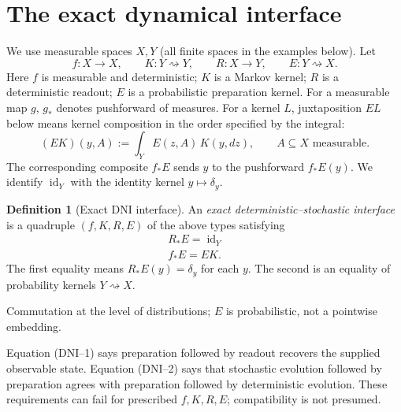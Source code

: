 \documentclass[11pt,letterpaper]{article}
\theoremstyle{definition}
\newtheorem{definition}[theorem]{Definition}
\theoremstyle{remark}
\newcommand{\D}{\mathcal D}
\newcommand{\id}{\operatorname{id}}
\begin{document}
\section{The exact dynamical interface}
We use measurable spaces $X,Y$ (all finite spaces in the examples below). Let
\[
f:X\to X,\qquad K:Y\rightsquigarrow Y,\qquad R:X\to Y,\qquad E:Y\rightsquigarrow X.
\]
Here $f$ is measurable and deterministic; $K$ is a Markov kernel; $R$ is a deterministic readout; $E$ is a probabilistic preparation kernel. For a measurable map $g$, $g_*$ denotes pushforward of measures. For a kernel $L$, juxtaposition $EL$ below means kernel composition in the order specified by the integral:
\[
(EK)(y,A):=\int_Y E(z,A)\,K(y,dz), \qquad A\subseteq X\text{ measurable}.
\]
The corresponding composite $f_*E$ sends $y$ to the pushforward $f_*E(y)$. We identify $\id_Y$ with the identity kernel $y\mapsto\delta_y$.

\begin{definition}[Exact DNI interface]\label{def:dni}
An \emph{exact deterministic--stochastic interface} is a quadruple $(f,K,R,E)$ of the above types satisfying
\begin{align}
\boxed{R_*E=\id_Y} && \tag{DNI--1}\label{eq:read}\\[3pt]
\boxed{f_*E=EK}. && \tag{DNI--2}\label{eq:intertwine}
\end{align}
The first equality means $R_*E(y)=\delta_y$ for each $y$. The second is an equality of probability kernels $Y\rightsquigarrow X$.
\end{definition}

\begin{center}
\end{center}
\begin{center}\small\color{charcoal}Commutation at the level of distributions; $E$ is probabilistic, not a pointwise embedding.\end{center}

Equation (DNI--1) says preparation followed by readout recovers the supplied observable state. Equation (DNI--2) says that stochastic evolution followed by preparation agrees with preparation followed by deterministic evolution. These requirements can fail for prescribed $f,K,R,E$; compatibility is not presumed.
\end{document}
